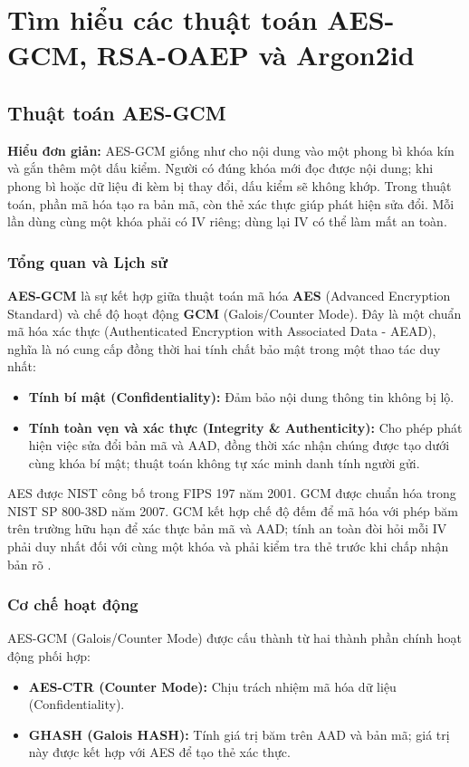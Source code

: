 \chapter{Tìm hiểu các thuật toán AES-GCM, RSA-OAEP và Argon2id}

\section{Thuật toán AES-GCM}

\noindent\textbf{Hiểu đơn giản:} AES-GCM giống như cho nội dung vào một phong bì khóa kín và gắn thêm một dấu kiểm. Người có đúng khóa mới đọc được nội dung; khi phong bì hoặc dữ liệu đi kèm bị thay đổi, dấu kiểm sẽ không khớp. Trong thuật toán, phần mã hóa tạo ra bản mã, còn thẻ xác thực giúp phát hiện sửa đổi. Mỗi lần dùng cùng một khóa phải có IV riêng; dùng lại IV có thể làm mất an toàn.

\subsection{Tổng quan và Lịch sử}
\textbf{AES-GCM} là sự kết hợp giữa thuật toán mã hóa \textbf{AES} (Advanced Encryption Standard) và chế độ hoạt động \textbf{GCM} (Galois/Counter Mode). Đây là một chuẩn mã hóa xác thực (Authenticated Encryption with Associated Data - AEAD), nghĩa là nó cung cấp đồng thời hai tính chất bảo mật trong một thao tác duy nhất:
\begin{itemize}
    \item \textbf{Tính bí mật (Confidentiality):} Đảm bảo nội dung thông tin không bị lộ.
    \item \textbf{Tính toàn vẹn và xác thực (Integrity \& Authenticity):} Cho phép phát hiện việc sửa đổi bản mã và AAD, đồng thời xác nhận chúng được tạo dưới cùng khóa bí mật; thuật toán không tự xác minh danh tính người gửi.
\end{itemize}

AES được NIST công bố trong FIPS 197 năm 2001. GCM được chuẩn hóa trong NIST SP 800-38D năm 2007. GCM kết hợp chế độ đếm để mã hóa với phép băm trên trường hữu hạn để xác thực bản mã và AAD; tính an toàn đòi hỏi mỗi IV phải duy nhất đối với cùng một khóa và phải kiểm tra thẻ trước khi chấp nhận bản rõ \cite{gcmnist}.

\subsection{Cơ chế hoạt động}
AES-GCM (Galois/Counter Mode) được cấu thành từ hai thành phần chính hoạt động phối hợp:
\begin{itemize}
    \item \textbf{AES-CTR (Counter Mode):} Chịu trách nhiệm mã hóa dữ liệu (Confidentiality).
    \item \textbf{GHASH (Galois HASH):} Tính giá trị băm trên AAD và bản mã; giá trị này được kết hợp với AES để tạo thẻ xác thực.
\end{itemize} 

